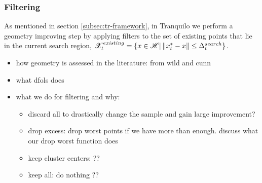 \subsubsection{Filtering}
\label{subsubsec:filtering}
As mentioned in section \ref{subsec:tr-framework}, in Tranquilo we perform a geometry improving step by applying filters to the set of existing points that lie in the current search region, $\mathscr{X}^{existing}_t = \{x\in\mathscr{H}|\hspace{0.2em}\lVert x^*_t-x\rVert\leq\Delta^{search}_t\}$.


\begin{itemize}
    \item how geometry is assessed in the literature: from wild and cunn
    \item what dfols does
    \item what we do for filtering and why:
    \begin{itemize}
        \item discard all to drastically change the sample and gain large improvement?
        \item drop excess: drop worst points if we have more than enough. discuss what our drop worst function does
        \item keep cluster centers: ??
        \item keep all: do nothing ??
    \end{itemize}
\end{itemize}
